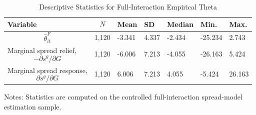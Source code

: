 \begin{table}[H]\centering
\begin{threeparttable}
\caption{Descriptive Statistics for Full-Interaction Empirical Theta}
\label{tab:theta_descriptive_stats}
\scriptsize
\begin{tabularx}{\textwidth}{lYYYYYY}
\toprule
Variable & $$N$$ & Mean & SD & Median & Min. & Max. \\
\midrule
$$\widehat{\theta}^{F}_{it}$$ & 1,120 & -3.341 & 4.337 & -2.434 & -25.234 & 2.743 \\
Marginal spread relief, $$-\partial s^g/\partial G$$ & 1,120 & -6.006 & 7.213 & -4.055 & -26.163 & 5.424 \\
Marginal spread response, $$\partial s^g/\partial G$$ & 1,120 & 6.006 & 7.213 & 4.055 & -5.424 & 26.163 \\
\bottomrule
\end{tabularx}
\begin{tablenotes}[flushleft]\footnotesize
\item Notes: Statistics are computed on the controlled full-interaction spread-model estimation sample.
\end{tablenotes}
\end{threeparttable}
\end{table}
